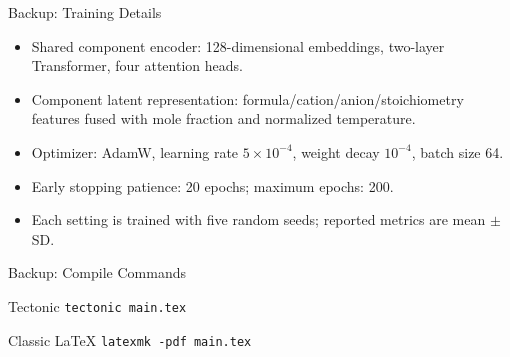 \documentclass[aspectratio=169,10pt]{beamer}
\begin{document}
\appendix

\begin{frame}{Backup: Training Details}
  \begin{itemize}
    \item Shared component encoder: 128-dimensional embeddings, two-layer Transformer, four attention heads.
    \item Component latent representation: formula/cation/anion/stoichiometry features fused with mole fraction and normalized temperature.
    \item Optimizer: AdamW, learning rate $5\times10^{-4}$, weight decay $10^{-4}$, batch size 64.
    \item Early stopping patience: 20 epochs; maximum epochs: 200.
    \item Each setting is trained with five random seeds; reported metrics are mean $\pm$ SD.
  \end{itemize}
\end{frame}

\begin{frame}{Backup: Compile Commands}
  \begin{block}{Tectonic}
    \texttt{tectonic main.tex}
  \end{block}

  \begin{block}{Classic LaTeX}
    \texttt{latexmk -pdf main.tex}
  \end{block}
\end{frame}
\end{document}

